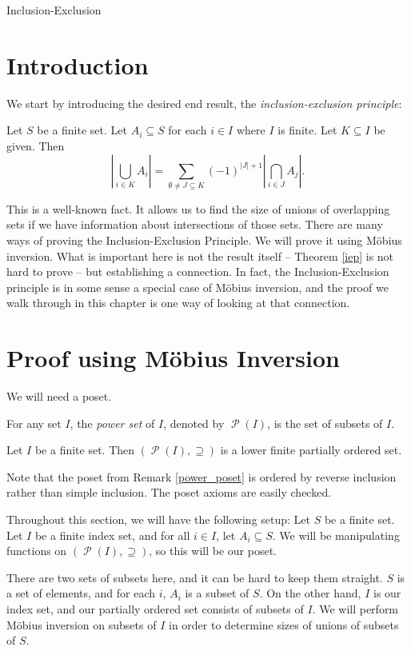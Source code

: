 \documentclass[12pt]{pom_thesis}
\DeclareMathOperator{\ps}{\mathscr{P}}
\begin{document}
\begin{chapter}{Inclusion-Exclusion}\label{chap:iep}
\section{Introduction}
We start by introducing the desired end result, the \emph{inclusion-exclusion principle}:
\begin{thm}\label{iep}
Let $S$ be a finite set. Let $A_i \subseteq S$ for each $i \in I$ where $I$ is finite. Let $K \subseteq I$ be given. Then
\[
\left|\bigcup_{i \in K}A_i\right| = \sum_{\emptyset \neq J \subseteq K}(-1)^{|J| + 1}\left|\bigcap_{i \in J}A_j\right|
.\]
\end{thm}
This is a well-known fact. It allows us to find the size of unions of overlapping sets if we have information about intersections of those sets. There are many ways of proving the Inclusion-Exclusion Principle. We will prove it using M\"obius inversion. What is important here is not the result itself -- Theorem \ref{iep} is not hard to prove -- but establishing a connection. In fact, the Inclusion-Exclusion principle is in some sense a special case of M\"obius inversion, and the proof we walk through in this chapter is one way of looking at that connection.

\section{Proof using M\"obius Inversion} 
We will need a poset.

\begin{defn}
For any set $I$, the \emph{power set} of $I$, denoted by $\ps(I)$, is the set of subsets of $I$. 
\end{defn}
\begin{rmk}\label{power_poset}
Let $I$ be a finite set. Then $(\ps(I), \supseteq)$ is a lower finite partially ordered set.
\end{rmk}
Note that the poset from Remark \ref{power_poset} is ordered by reverse inclusion rather than simple inclusion. The poset axioms are easily checked.

Throughout this section, we will have the following setup: Let $S$ be a finite set. Let $I$ be a finite index set, and for all $i \in I$, let $A_i \subseteq S$. We will be manipulating functions on $(\ps(I), \supseteq)$, so this will be our poset. 

There are two sets of subsets here, and it can be hard to keep them straight. $S$ is a set of elements, and for each $i$, $A_i$ is a subset of $S$. On the other hand, $I$ is our index set, and our partially ordered set consists of subsets of $I$. We will perform M\"obius inversion on subsets of $I$ in order to determine sizes of unions of subsets of $S$.


\end{chapter}
\end{document}
